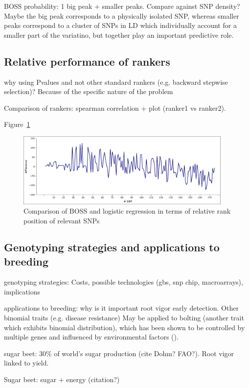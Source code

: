BOSS probability: 1 big peak + smaller peaks. Compare against SNP
density? Maybe the big peak corresponds to a physically isolated SNP,
whereas smaller peaks correspond to a cluster of SNPs in LD which
individually account for a smaller part of the variatino, but together
play an important predictive role. 

\subsection{Relative performance of rankers}
why using Pvalues and not other standard rankers (e.g. backward stepwise
selection)? Because of the specific nature of the problem

Comparison of rankers: spearman correlation + plot (ranker1 vs ranker2).

Figure~\ref{fig:rank}

\begin{figure}
\includegraphics[width=0.95\textwidth]{rank.pdf}
\caption{Comparison of BOSS and logistic regression in terms of relative
rank position of relevant SNPs}
\label{fig:rank} 
\end{figure}


\subsection{Genotyping strategies and applications to breeding}
genotyping strategies: 
Costs, possible technologies (gbs, snp chip, macroarrays), implications

applications to breeding:
why is it important root vigor early detection. Other binomial traits (e.g.
disease resistance) May be applied to bolting (another trait which
exhibits binomial distribution), which has been shown to be controlled
by multiple genes and influenced by environmental factors
(\cite{salah2012genetic}).

sugar beet: $30\%$ of world's sugar production (cite Dohm? FAO?). Root
vigor linked to yield.

Sugar beet: sugar + energy (citation?)

